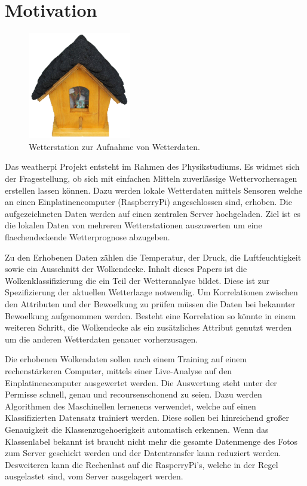 \section{Motivation}
\label{sec:Motivation}

\begin{figure}
		\vspace{-0.9cm}
		\centering
		\includegraphics[width=0.4\textwidth]{./pictures/wetterstation.pdf}
		\caption{Wetterstation zur Aufnahme von Wetterdaten.}
		\label{fig:name}
		\vspace{-0.5cm}
\end{figure}
Das weatherpi Projekt entsteht im Rahmen des Physikstudiums.
Es widmet sich der Fragestellung, ob sich mit einfachen Mitteln zuverlässige
Wettervorhersagen erstellen lassen können.
Dazu werden lokale Wetterdaten mittels Sensoren welche an einen 
Einplatinencomputer (RaspberryPi) angeschlossen sind, erhoben.
Die aufgezeichneten Daten werden auf einen zentralen Server hochgeladen.
Ziel ist es die lokalen Daten von mehreren Wetterstationen auszuwerten um eine
flaechendeckende Wetterprognose abzugeben. 

Zu den Erhobenen Daten zählen die Temperatur, der Druck, die Luftfeuchtigkeit
sowie ein Ausschnitt der Wolkendecke.
Inhalt dieses Papers ist die Wolkenklassifizierung die ein Teil der
Wetteranalyse bildet.
Diese ist zur Spezifizierung der aktuellen Wetterlaage notwendig.
Um Korrelationen zwischen den Attributen und der Bewoelkung zu prüfen
müssen die Daten bei bekannter Bewoelkung aufgenommen werden.
Besteht eine Korrelation so könnte in einem weiteren Schritt, die Wolkendecke
als ein zusätzliches Attribut genutzt werden um die anderen Wetterdaten genauer
vorherzusagen. 

Die erhobenen Wolkendaten sollen nach einem Training auf einem rechenstärkeren
Computer, mittels einer Live-Analyse auf den Einplatinencomputer ausgewertet 
werden.
Die Auswertung steht unter der Permisse schnell, genau und recoursenschonend 
zu seien.
Dazu werden Algorithmen des Maschinellen lernenens verwendet, welche auf einen
Klassifizierten Datensatz trainiert werden. 
Diese sollen bei hinreichend großer Genauigkeit die Klassenzugehoerigkeit
automatisch erkennen.
Wenn das Klassenlabel bekannt ist braucht nicht mehr die gesamte Datenmenge des
Fotos zum Server geschickt werden und der Datentransfer kann reduziert werden. 
Desweiteren kann die Rechenlast auf die RasperryPi's, welche in der Regel 
ausgelastet sind, vom Server ausgelagert werden. 


